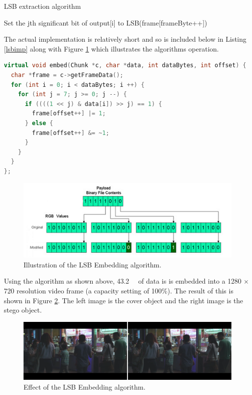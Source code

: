 \documentclass[paper=a4, fontsize=11pt,twoside]{scrartcl}
\numberwithin{table}{section}
\numberwithin{figure}{section}
\numberwithin{algorithm}{section}
\begin{document}
\begin{algorithm}[!htb]
\caption{LSB extraction algorithm}
\label{lsbext}
\begin{algorithmic}[1]
		\State Set the jth significant bit of output[i] to LSB(frame[frameByte++]) 
	\EndFor
\EndFor
\end{algorithmic}
\end{algorithm}

\noindent
The actual implementation is relatively short and so is included below in Listing \ref{lsbimp} along with Figure \ref{lsbill} which illustrates the algorithms operation.

\begin{lstlisting}[language=C++, caption={LSB embedding implementation (\texttt{steg/lsb\_algorithm.cc:8})}, frame=single, label=lsbimp]
virtual void embed(Chunk *c, char *data, int dataBytes, int offset) {
  char *frame = c->getFrameData();
  for (int i = 0; i < dataBytes; i ++) {
    for (int j = 7; j >= 0; j --) {
      if ((((1 << j) & data[i]) >> j) == 1) {
        frame[offset++] |= 1;
      } else {
        frame[offset++] &= ~1;
      }
    }
  }
};
\end{lstlisting}

\begin{figure}[!htb]
\centerline{\includegraphics[width=\textwidth]{images/lsb_ill.png}}
\caption{Illustration of the LSB Embedding algorithm.}
\label{lsbill}
\end{figure}

\noindent
Using the algorithm as shown above, \SI{43.2}{\kilo\byte} of data is is embedded into a 1280 $\times$ 720 resolution video frame (a capacity setting of 100\%). The result of this is shown in Figure \ref{lsbemb_full}. The left image is the cover object and the right image is the stego object. 

\begin{figure}[!h]
\centerline{\includegraphics[width=\textwidth]{images/lsb_emb_full.png}}
\caption{Effect of the LSB Embedding algorithm.}
\label{lsbemb_full}
\end{figure}
\end{document}

